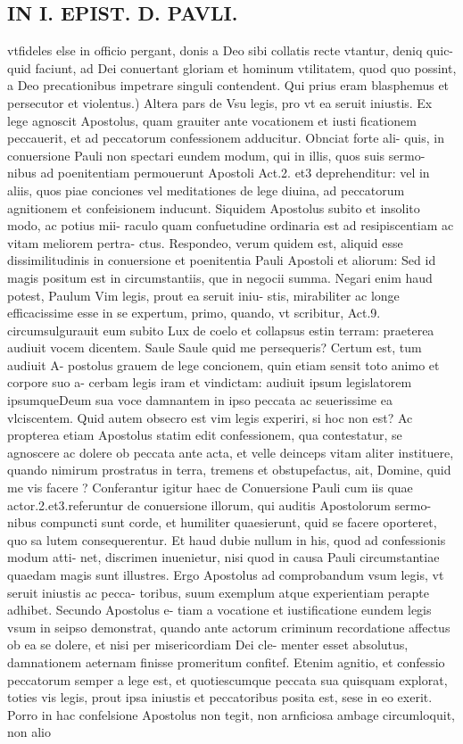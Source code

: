 \documentclass{article}
\begin{document}
\begin{pages}
\section*{IN I. EPIST. D. PAVLI. }
\marginpar{[ p.33 ]}\pstart vtfideles else in officio pergant, donis a Deo sibi collatis recte vtantur, deniq quic- quid faciunt, ad Dei conuertant gloriam et hominum vtilitatem, quod quo possint, a Deo precationibus impetrare singuli contendent.  \pend\pstart Qui prius eram blasphemus et persecutor et violentus.) Altera pars de Vsu legis, pro vt ea seruit iniustis. Ex lege agnoscit Apostolus, quam grauiter ante vocationem et iusti ficationem peccauerit, et ad peccatorum confessionem adducitur. Obnciat forte ali- quis, in conuersione Pauli non spectari eundem modum, qui in illis, quos suis sermo- nibus ad poenitentiam permouerunt Apostoli Act.2. et3 deprehenditur: vel in aliis, quos piae conciones vel meditationes de lege diuina, ad peccatorum agnitionem et confeisionem inducunt. Siquidem Apostolus subito et insolito modo, ac potius mii- raculo quam confuetudine ordinaria est ad resipiscentiam ac vitam meliorem pertra- ctus. Respondeo, verum quidem est, aliquid esse dissimilitudinis in conuersione et poenitentia Pauli Apostoli et aliorum: Sed id magis positum est in circumstantiis, que  in negocii summa. Negari enim haud potest, Paulum Vim legis, prout ea seruit iniu- stis, mirabiliter ac longe efficacissime esse in se expertum, primo, quando, vt scribitur, Act.9. circumsulgurauit eum subito Lux de coelo et collapsus estin terram: praeterea audiuit vocem dicentem. Saule Saule quid me persequeris? Certum est, tum audiuit A- postolus grauem de lege concionem, quin etiam sensit toto animo et corpore suo a- cerbam legis iram et vindictam: audiuit ipsum legislatorem ipsumqueDeum sua voce damnantem in ipso peccata ac seuerissime ea vlciscentem. Quid autem obsecro est vim legis experiri, si hoc non est? Ac propterea etiam Apostolus statim edit confessionem, qua contestatur, se agnoscere ac dolere ob peccata ante acta, et velle deinceps vitam aliter instituere, quando nimirum prostratus in terra, tremens et obstupefactus, ait,   Domine, quid me vis facere ? Conferantur igitur haec de Conuersione Pauli cum iis quae actor.2.et3.referuntur de conuersione illorum, qui auditis Apostolorum sermo- nibus compuncti sunt corde, et humiliter quaesierunt, quid se facere oporteret, quo sa lutem consequerentur. Et haud dubie nullum in his, quod ad confessionis modum atti- net, discrimen inuenietur, nisi quod in causa Pauli circumstantiae quaedam magis sunt illustres. Ergo Apostolus ad comprobandum vsum legis, vt seruit iniustis ac pecca- toribus, suum exemplum atque  experientiam perapte adhibet. Secundo Apostolus e- tiam a vocatione et iustificatione eundem legis vsum in seipso demonstrat, quando ante actorum criminum recordatione affectus ob ea se dolere, et nisi per misericordiam Dei cle- menter esset absolutus, damnationem aeternam finisse promeritum confitef. Etenim agnitio, et confessio peccatorum semper a lege est, et quotiescumque  peccata sua quisquam explorat, toties vis legis, prout ipsa iniustis et peccatoribus posita est, sese in eo exerit. Porro in hac confelsione Apostolus non tegit, non arnficiosa ambage circumloquit, non alio 
\end{pages}
\end{document}

